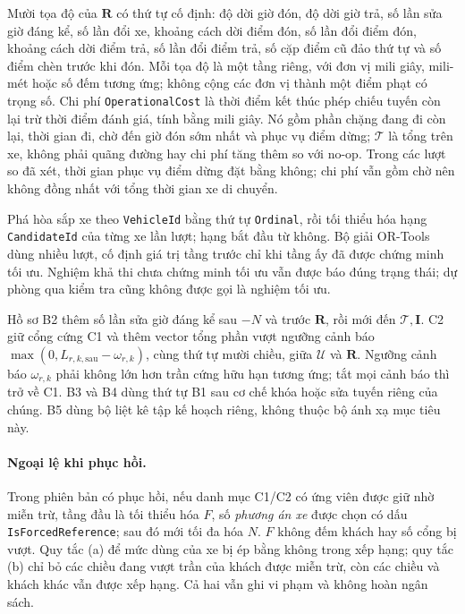 Mười tọa độ của $\mathbf{R}$ có thứ tự cố định: độ dời giờ đón, độ dời giờ trả, số lần
sửa giờ đáng kể, số lần đổi xe, khoảng cách dời điểm đón, số lần đổi điểm đón,
khoảng cách dời điểm trả, số lần đổi điểm trả, số cặp điểm cũ đảo thứ tự và số điểm
chèn trước khi đón. Mỗi tọa độ là một tầng riêng, với đơn vị mili giây, mili-mét hoặc
số đếm tương ứng; không cộng các đơn vị thành một điểm phạt có trọng số.
Chi phí \texttt{OperationalCost} là thời điểm kết thúc phép chiếu tuyến còn lại trừ
thời điểm đánh giá, tính bằng mili giây. Nó gồm phần chặng đang đi còn lại, thời gian
đi, chờ đến giờ đón sớm nhất và phục vụ điểm dừng; $\mathcal{T}$ là tổng trên xe,
không phải quãng đường hay chi phí tăng thêm so với no-op. Trong các lượt so đã xét,
thời gian phục vụ điểm dừng đặt bằng không; chi phí vẫn gồm chờ nên không đồng nhất
với tổng thời gian xe di chuyển.

Phá hòa sắp xe theo \texttt{VehicleId} bằng thứ tự \texttt{Ordinal}, rồi tối thiểu hóa
hạng \texttt{CandidateId} của từng xe lần lượt; hạng bắt đầu từ không. Bộ giải OR-Tools
dùng nhiều lượt, cố định giá trị tầng trước chỉ khi tầng ấy đã được chứng minh tối ưu.
Nghiệm khả thi chưa chứng minh tối ưu vẫn được báo đúng trạng thái; dự phòng qua kiểm
tra cũng không được gọi là nghiệm tối ưu.

Hồ sơ B2 thêm số lần sửa giờ đáng kể sau $-N$ và trước $\mathbf{R}$, rồi mới đến
$\mathcal{T},\mathbf{I}$. C2 giữ cổng cứng C1 và thêm vector tổng phần vượt ngưỡng cảnh
báo $\max(0,L_{r,k,\mathrm{sau}}-\omega_{r,k})$, cùng thứ tự mười chiều, giữa
$\mathcal{U}$ và $\mathbf{R}$. Ngưỡng cảnh báo $\omega_{r,k}$ phải không lớn hơn trần
cứng hữu hạn tương ứng; tắt mọi cảnh báo thì trở về C1.
B3 và B4 dùng thứ tự B1 sau cơ chế khóa hoặc sửa tuyến riêng của chúng. B5 dùng bộ
liệt kê tập kế hoạch riêng, không thuộc bộ ánh xạ mục tiêu này.

\paragraph{Ngoại lệ khi phục hồi.}
Trong phiên bản có phục hồi, nếu danh mục C1/C2 có ứng viên được giữ nhờ miễn trừ,
tầng đầu là tối thiểu hóa $F$, số \emph{phương án xe} được chọn có dấu
\texttt{IsForcedReference}; sau đó mới tối đa hóa $N$. $F$ không đếm khách hay số cổng
bị vượt. Quy tắc (a) để mức dùng của xe bị ép bằng không trong xếp hạng; quy tắc (b)
chỉ bỏ các chiều đang vượt trần của khách được miễn trừ, còn các chiều và khách khác
vẫn được xếp hạng. Cả hai vẫn ghi vi phạm và không hoàn ngân sách.

